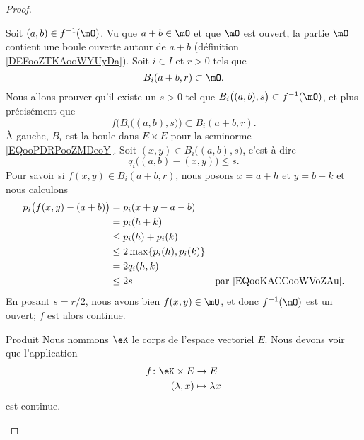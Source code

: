 \begin{proof}
\begin{subproof}
		Soit \( (a,b)\in f^{-1}(\mO)\). Vu que \( a+b\in \mO\) et que \( \mO\) est ouvert, la partie \( \mO\) contient une boule ouverte autour de \( a+b\) (définition \ref{DEFooZTKAooWYUyDa}). Soit \( i\in I\) et \( r>0\) tels que
		\begin{equation}
			B_i(a+b,r)\subset \mO.
		\end{equation}
		Nous allons prouver qu'il existe un \( s>0\) tel que \( B_i\big( (a,b),s \big)\subset f^{-1}(\mO)\), et plus précisément que
		\begin{equation}
			f\Big( B_i\big( (a,b),s \big) \Big)\subset B_i(a+b,r).
		\end{equation}
		À gauche, \( B_i\) est la boule dans \( E\times E\) pour la seminorme \eqref{EQooPDRPooZMDeoY}. Soit \( (x,y)\in B_i\big( (a,b),s \big)\), c'est à dire
		\begin{equation}    \label{EQooKACCooWVoZAu}
			q_i\big( (a,b)-(x,y) \big)\leq s.
		\end{equation}
		Pour savoir si \( f(x,y)\in B_i(a+b,r)\), nous posons \( x=a+h\) et \( y=b+k\) et nous calculons
		\begin{subequations}
			\begin{align}
				p_i\big( f(x,y)-(a+b) \big) & =p_i(x+y-a-b)                                                        \\
				                            & =p_i(h+k)                                                            \\
				                            & \leq p_i(h)+p_i(k)                                                   \\
				                            & \leq 2\max\{ p_i(h),p_i(k) \}                                        \\
				                            & =2q_i(h,k)                                                           \\
				                            & \leq 2s                       & \text{par \eqref{EQooKACCooWVoZAu}.}
			\end{align}
		\end{subequations}
		En posant \( s=r/2\), nous avons bien \( f(x,y)\in \mO\), et donc \( f^{-1}(\mO)\) est un ouvert; \( f\) est alors continue.
		\item[Produit]
		Nous nommons \( \eK\) le corps de l'espace vectoriel \( E\). Nous devons voir que l'application
		\begin{equation}
			\begin{aligned}
				f\colon \eK\times E & \to E             \\
				(\lambda,x)         & \mapsto \lambda x
			\end{aligned}
		\end{equation}
		est continue.


\end{subproof}
\end{proof}
